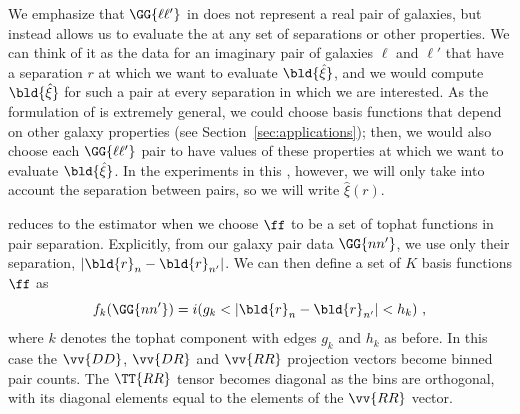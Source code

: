 We emphasize that $\GG{\ell \ell'}$ in  does not represent a real pair of galaxies, but instead allows us to evaluate the \cf at any set of separations or other properties.
We can think of it as the data for an imaginary pair of galaxies $\ell$ and $\ell'$ that have a separation $r$ at which we want to evaluate $\bld{\hat{\xi}}$, and we would compute $\bld{\hat{\xi}}$ for such a pair at every separation in which we are interested.
As the formulation of \est is extremely general, we could choose basis functions that depend on other galaxy properties (see Section~\ref{sec:applications}); then, we would also choose each $\GG{\ell \ell'}$ pair to have values of these properties at which we want to evaluate $\bld{\hat{\xi}}$.
In the experiments in this \documentname, however, we will only take into account the separation between pairs, so we will write $\hat{\xi}(r)$.

\Est reduces to the \LS estimator when we choose $\ff$ to be a set of tophat functions in pair separation.
Explicitly, from our galaxy pair data $\GG{n n'}$, we use only their separation,  $|\bld{r}_n - \bld{r}_{n'}|$.
We can then define a set of $K$ basis functions $\ff$ as
\begin{equation}
    \label{eq:ff_separation}
    f_k(\GG{n n'}) =  i(g_k < |\bld{r}_n - \bld{r}_{n'}| < h_k) ~,
\end{equation}
where $k$ denotes the tophat component with edges $g_k$ and $h_k$ as before.
In this case the $\vv{DD}$, $\vv{DR}$ and $\vv{RR}$ projection vectors become binned pair counts.
The $\TT{RR}$ tensor becomes diagonal as the bins are orthogonal, with its diagonal elements equal to the elements of the $\vv{RR}$ vector.


